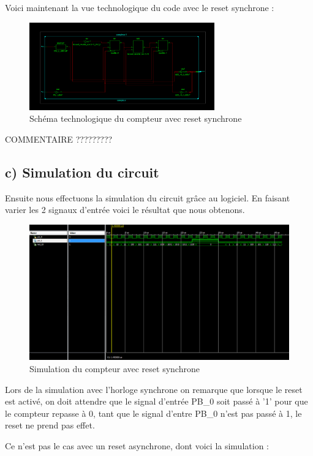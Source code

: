 \documentclass[11pt]{report}
\begin{document}
Voici maintenant la vue technologique du code avec le reset synchrone : 

\begin{figure}[h]
\includegraphics[width=8cm]{TP02-4.PNG}
\caption{Schéma technologique du compteur avec reset synchrone}
\end{figure}

COMMENTAIRE ????????? 
 
\subsection{ c) Simulation du circuit}

Ensuite nous effectuons la simulation du circuit grâce au logiciel. 
En faisant varier les 2 signaux d'entrée voici le résultat que nous obtenons.

\begin{figure}[h]
\includegraphics[width=15cm]{TP02-1.PNG}
\caption{Simulation du compteur avec reset synchrone}
\end{figure}

Lors de la simulation avec l'horloge synchrone on remarque que lorsque le reset est activé, on doit attendre que le signal d'entrée PB\_0 soit passé à '1' pour que le compteur repasse à 0, tant que le signal d'entre PB\_0 n'est pas passé à 1, le reset ne prend pas effet.

Ce n'est pas le cas avec un reset asynchrone, dont voici la simulation :
\end{document}
